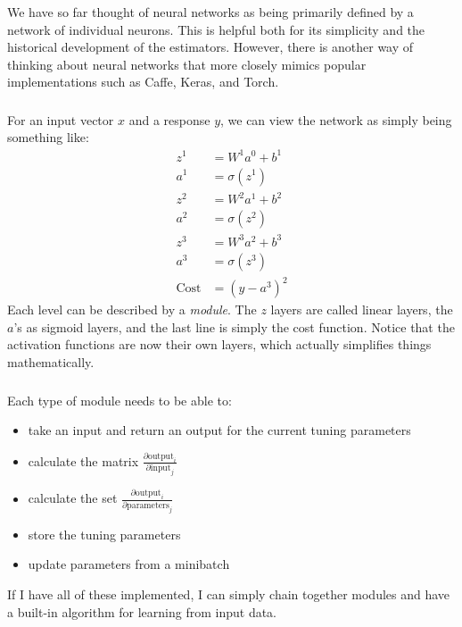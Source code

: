\documentclass[xetex,mathserif,serif,aspectratio=169]{beamer}
\begin{document}
\begin{frame}[fragile] \frametitle{} \oldB \small

\textbf{}

We have so far thought of neural networks as being primarily
defined by a network of individual neurons. This is helpful
both for its simplicity and the historical development of the
estimators. However, there is another way of thinking about
neural networks that more closely mimics popular implementations
such as Caffe, Keras, and Torch.

\end{frame}

\begin{frame}[fragile] \frametitle{} \oldB \small

\textbf{}

For an input vector $x$ and a response $y$, we can view the network
as simply being something like:
\begin{align}
z^1 &= W^1 a^0 + b^1 \\
a^1 &= \sigma(z^1) \\
z^2 &= W^2 a^1 + b^2 \\
a^2 &= \sigma(z^2) \\
z^3 &= W^3 a^2 + b^3 \\
a^3 &= \sigma(z^3) \\
\text{Cost} &= (y - a^3)^2
\end{align}
\pause Each level can be described by a \textit{module}. The $z$ layers
are called linear layers, the $a$'s as sigmoid layers, and the last
line is simply the cost function. Notice that the activation functions
are now their own layers, which actually simplifies things mathematically.

\end{frame}

\begin{frame}[fragile] \frametitle{} \oldB \small

\textbf{}

Each type of module needs to be able to:
\begin{itemize}
\item take an input and return an output for the current tuning parameters
\item calculate the matrix $\frac{\partial \text{output}_i}{\partial \text{input}_j}$
\item calculate the set $\frac{\partial \text{output}_i}{\partial \text{parameters}_j}$
\item store the tuning parameters
\item update parameters from a minibatch
\end{itemize}
If I have all of these implemented, I can simply chain together
modules and have a built-in algorithm for learning from input data.

\end{frame}
\end{document}
